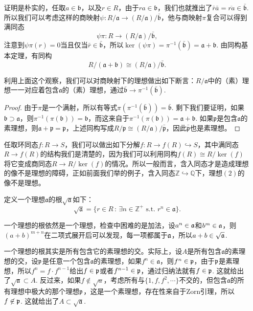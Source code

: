 证明是朴实的，任取$a\in \mathfrak{b}$，以及$r \in R$，由于$ra\in \mathfrak{b}$，我们也就推出了$\bar{r}\bar{a}=\overline{ra}\in \bar{\mathfrak{b}}$. 所以我们可以考虑这样的商映射$\psi: R/\mathfrak{a}\to (R/\mathfrak{a})/\bar{\mathfrak{b}}$，他与商映射$\pi$复合可以得到满同态
\[
	\psi\pi:R\to (R/\mathfrak{a})/\bar{\mathfrak{b}},
\]
注意到$\psi\pi(r)=0$当且仅当$\bar{r}\in \bar{\mathfrak{b}}$，所以$\ker(\psi\pi)=\pi^{-1}(\bar{\mathfrak{b}})=\mathfrak{a}+\mathfrak{b}$. 由同构基本定理，有同构
\[
	R/(\mathfrak{a}+\mathfrak{b})\cong (R/\mathfrak{a})/\bar{\mathfrak{b}}.
\]

\para 利用上面这个观察，我们可以对商映射下的理想做出如下断言：$R/\mathfrak{a}$中的（素）理想一一对应着包含$\mathfrak{a}$的（素）理想，通过$\bar{\mathfrak{b}}\to \pi^{-1}(\bar{\mathfrak{b}})$.

\begin{proof} 
	由于$\pi$是一个满射，所以有等式$\pi(\pi^{-1}(\bar{\mathfrak{b}}))=\bar{\mathfrak{b}}$. 剩下我们要证明，如果$\mathfrak{b}\supset \mathfrak{a}$，则$\pi^{-1}(\pi(\mathfrak{b}))=\mathfrak{b}$，而这来自于$\pi^{-1}(\pi(\mathfrak{b}))=\mathfrak{a}+\mathfrak{b}$. 如果$\mathfrak{p}$是包含$\mathfrak{a}$的素理想，则$\mathfrak{a}+\mathfrak{p}=\mathfrak{p}$，上述同构写成$R/\mathfrak{p}\cong (R/\mathfrak{a})/\bar{\mathfrak{p}}$，因此$\bar{\mathfrak{p}}$也是素理想。
\end{proof}

\para 任取环同态$f:R\to S$，我们可以做出如下分解$f:R\to f(R)\hookrightarrow S$，其中满同态$R\to f(R)$的结构我们是清楚的，因为我们可以利用同构$f(R)\cong R/\ker(f)$将它变成商同态$R\to R/\ker(f)$的情况。所以一般而言，含入同态才是造成理想的像不是理想的障碍，正如前面我们举的例子，含入同态$\mathbb{Z}\hookrightarrow \mathbb{Q}$下，理想$(2)$的像不是理想。

\para 定义一个理想$\mathfrak{a}$的根$\sqrt{\mathfrak{a}}$如下：
\[
	\sqrt{\mathfrak{a}}=\{r\in R\,:\,\exists n\in \mathbb{Z}^+\text{ s.t. }r^n\in \mathfrak{a}\}.
\]

一个理想的根依然是一个理想，检查中困难的是加法，设$a^n\in \mathfrak{a}$和$b^m\in \mathfrak{a}$，则$(a+b)^{m+n}$在二项式展开后可以发现，每一项都属于$\mathfrak{a}$，所以$a+b\in \sqrt{\mathfrak{a}}$.

一个理想的根其实是所有包含它的素理想的交。实际上，设$A$是所有包含$\mathfrak{a}$的素理想的交，设$\mathfrak{p}$是任意一个包含$\mathfrak{a}$的素理想，如果$f^n\in \mathfrak{a}$，则$f^n\in \mathfrak{p}$，由于$\mathfrak{p}$是素理想，所以$f^n=f\cdot f^{n-1}$给出$f\in\mathfrak{p}$或者$f^{n-1}\in\mathfrak{p}$，通过归纳法就有$f\in \mathfrak{p}$. 这就给出了$\sqrt{\mathfrak{a}}\subset A$. 反过来，如果$f\not\in \sqrt{a}$，考虑所有与$\{1,f,f^2,\cdots\}$不交的，但包含$\mathfrak{a}$的所有理想中极大的那个理想$\mathfrak{p}$，这是一个素理想，存在性来自于Zorn引理，所以$f\not\in \mathfrak{p}$. 这就给出了$A\subset \sqrt{\mathfrak{a}}$.

